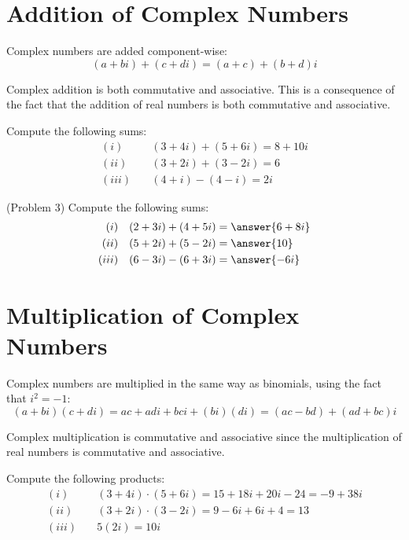 \documentclass[handout]{ximera}
\begin{document}
\section{Addition of Complex Numbers}

Complex numbers are added component-wise:
\[
(a+bi) + (c+di) = (a+c) + (b+d)i
\]

Complex addition is both commutative and associative. This is a consequence of the fact that the addition of real numbers is both commutative and associative.

\begin{example}[Example 3]
Compute the following sums:
\begin{align*}
(i)& \quad (3+4i) + (5+6i) = 8+10i \\
(ii)& \quad (3+2i) + (3-2i) = 6 \\
(iii)& \quad (4+i) - (4-i) = 2i
\end{align*}

\end{example}


\begin{problem}(Problem 3)
Compute the following sums:
\begin{align*}
(i)& \quad (2+3i) + (4+5i) = \answer{6+8i} \\
(ii)& \quad(5+2i) + (5-2i) = \answer{10}\\
(iii)& \quad(6-3i) - (6+3i) = \answer{-6i}
\end{align*}
\end{problem}

\section{Multiplication of Complex Numbers}
Complex numbers are multiplied in the same way as binomials, using the fact that $i^2 = -1$:
\[
(a+bi)(c+di) = ac + adi + bci + (bi)(di) = (ac-bd) + (ad+bc)i
\]

Complex multiplication is commutative and associative since the multiplication of real numbers is commutative and associative.

\begin{example}[Example 4]
Compute the following products:
\begin{align*}
(i)& \quad (3+4i) \cdot (5+6i) = 15 + 18i + 20i - 24 = -9 + 38i \\
(ii)& \quad (3+2i) \cdot (3-2i) = 9-6i+6i+4=13 \\
(iii)& \quad 5(2i) = 10i
\end{align*}

\end{example}
\end{document}
